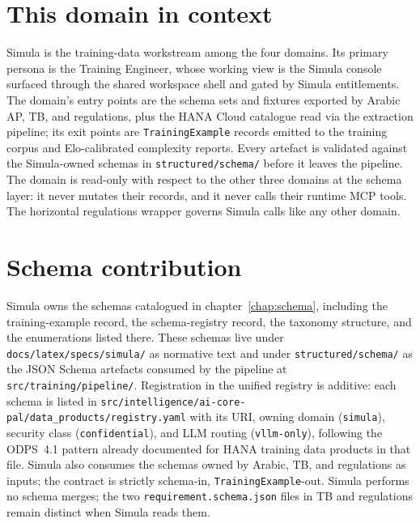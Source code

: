\section{This domain in context}
\label{sec:agent-domain-context}
Simula is the training-data workstream among the four domains. Its
primary persona is the Training Engineer, whose working view is the
Simula console surfaced through the shared workspace shell and gated
by Simula entitlements. The domain's entry points are the schema
sets and fixtures exported by Arabic AP, TB, and regulations, plus
the HANA Cloud catalogue read via the extraction pipeline; its exit
points are \texttt{TrainingExample} records emitted to the training
corpus and Elo-calibrated complexity reports. Every artefact is
validated against the Simula-owned schemas in
\texttt{structured/schema/} before it leaves the pipeline. The
domain is read-only with respect to the other three domains at the
schema layer: it never mutates their records, and it never calls
their runtime MCP tools. The horizontal regulations wrapper governs
Simula calls like any other domain.

\section{Schema contribution}
\label{sec:agent-schema-contrib}
Simula owns the schemas catalogued in
chapter~\ref{chap:schema}, including the training-example record,
the schema-registry record, the taxonomy structure, and the
enumerations listed there. These schemas live under
\texttt{docs/latex/specs/simula/} as normative text and under
\texttt{structured/schema/} as the JSON Schema artefacts consumed by
the pipeline at \texttt{src/training/pipeline/}. Registration in the
unified registry is additive: each schema is listed in
\texttt{src/intelligence/ai-core-pal/data\_products/registry.yaml}
with its URI, owning domain (\texttt{simula}), security class
(\texttt{confidential}), and LLM routing (\texttt{vllm-only}),
following the ODPS~4.1 pattern already documented for HANA training
data products in that file. Simula also consumes the schemas owned
by Arabic, TB, and regulations as inputs; the contract is strictly
schema-in, \texttt{TrainingExample}-out. Simula performs no schema
merges; the two \texttt{requirement.schema.json} files in TB and
regulations remain distinct when Simula reads them.

